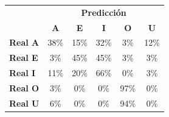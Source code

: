 \begin{tabular}{lccccc}
\toprule
 & \multicolumn{5}{c}{\textbf{Predicción}} \\
 & \textbf{A} & \textbf{E} & \textbf{I} & \textbf{O} & \textbf{U} \\
\midrule
\textbf{Real A} & \cellcolor[rgb]{0.73,0.73,1.00}  38\% & \cellcolor[rgb]{0.90,0.90,1.00}  15\% & \cellcolor[rgb]{0.77,0.77,1.00}  32\% & \cellcolor[rgb]{0.98,0.98,1.00}  3\% & \cellcolor[rgb]{0.92,0.92,1.00}  12\% \\
\textbf{Real E} & \cellcolor[rgb]{0.98,0.98,1.00}  3\% & \cellcolor[rgb]{0.68,0.68,1.00}  45\% & \cellcolor[rgb]{0.68,0.68,1.00}  45\% & \cellcolor[rgb]{0.98,0.98,1.00}  3\% & \cellcolor[rgb]{0.98,0.98,1.00}  3\% \\
\textbf{Real I} & \cellcolor[rgb]{0.92,0.92,1.00}  11\% & \cellcolor[rgb]{0.86,0.86,1.00}  20\% & \cellcolor[rgb]{0.54,0.54,1.00} \color{white} 66\% & \cellcolor[rgb]{1.00,1.00,1.00}  0\% & \cellcolor[rgb]{0.98,0.98,1.00}  3\% \\
\textbf{Real O} & \cellcolor[rgb]{0.98,0.98,1.00}  3\% & \cellcolor[rgb]{1.00,1.00,1.00}  0\% & \cellcolor[rgb]{1.00,1.00,1.00}  0\% & \cellcolor[rgb]{0.32,0.32,1.00} \color{white} 97\% & \cellcolor[rgb]{1.00,1.00,1.00}  0\% \\
\textbf{Real U} & \cellcolor[rgb]{0.96,0.96,1.00}  6\% & \cellcolor[rgb]{1.00,1.00,1.00}  0\% & \cellcolor[rgb]{1.00,1.00,1.00}  0\% & \cellcolor[rgb]{0.34,0.34,1.00} \color{white} 94\% & \cellcolor[rgb]{1.00,1.00,1.00}  0\% \\
\bottomrule
\end{tabular}